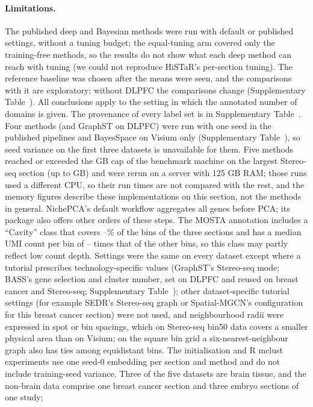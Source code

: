 \documentclass[unnumsec,webpdf,contemporary,large]{oup-authoring-template}
\begin{document}
\paragraph{Limitations.}
The published deep and Bayesian methods were run with default or published settings, without a tuning budget; the equal-tuning arm
covered only the training-free methods, so the results do not show what each deep method can reach with tuning (we could not reproduce
HiSTaR's per-section tuning). The reference baseline was chosen after the means were seen, and the comparisons with it are
exploratory; without DLPFC the comparisons change (Supplementary Table~\STpaired). All conclusions apply to the setting in which the annotated
number of domains is given. The provenance of every label set is in Supplementary Table~\STprov. Four methods (and GraphST on DLPFC) were run with one seed in the published pipelines
and BayesSpace on Visium only (Supplementary Table~\STcov), so seed variance on the first three datasets is unavailable for them.
Five methods reached or exceeded the \memCap{} GB cap of the benchmark machine on the largest Stereo-seq section (up to \peakBigMax{} GB) and
were rerun on a server with 125 GB RAM; those runs used a different CPU, so their run times are not compared with the rest, and the
memory figures describe these implementations on this section, not the methods in general. NichePCA's default workflow aggregates
all genes before PCA; its package also offers other orders of these steps. The MOSTA annotation includes a ``Cavity'' class that covers \cavityFracLo--\cavityFracHi\% of the bins of the three sections and has a median UMI count per bin of \cavityRatioLo--\cavityRatioHi{} times that of the other bins, so this class may partly reflect low count depth. Settings were the same on every dataset except where a tutorial prescribes technology-specific values (GraphST's Stereo-seq mode; BASS's gene selection and cluster number, set on DLPFC and reused on breast cancer and Stereo-seq; Supplementary Table~\STmethods); other dataset-specific tutorial settings (for example SEDR's Stereo-seq graph or Spatial-MGCN's configuration for this breast
cancer section) were not used, and neighbourhood radii were expressed in spot or bin spacings, which on Stereo-seq bin50 data
covers a smaller physical area than on Visium; on the square bin grid a six-nearest-neighbour graph also has ties among equidistant
bins. The initialisation and R
mclust experiments use one seed-0 embedding per section and method and do not include training-seed variance. Three of the five
datasets are brain tissue, and the non-brain data comprise one breast cancer section and three embryo sections of one study;
\end{document}
